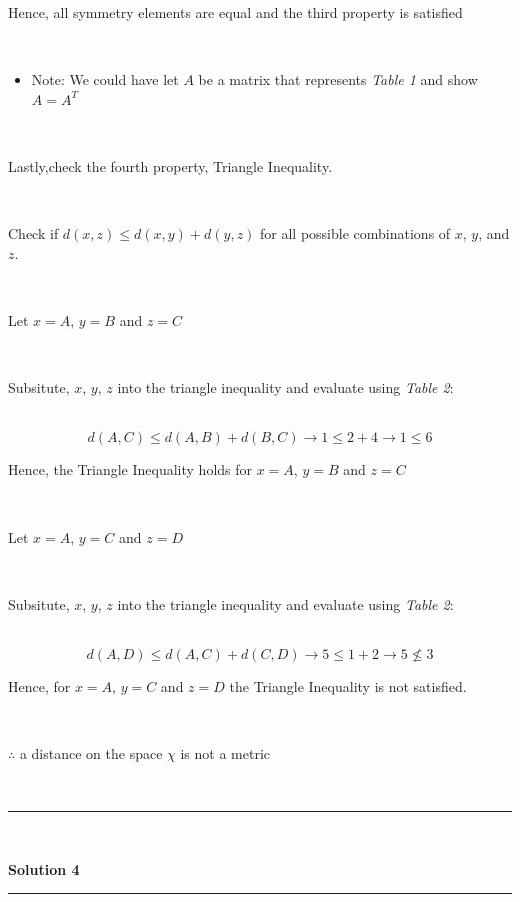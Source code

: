 \documentclass{article}
\begin{document}
\parbox{\textwidth}{Hence, all symmetry elements are equal and the third property is satisfied}\\

\begin{itemize}
  \item \parbox{\textwidth}{Note: We could have let $A$ be a matrix that represents \textit{Table 1} and show $A=A^T$}\\
\end{itemize}

\parbox{\textwidth}{Lastly,check the fourth property, Triangle Inequality.}\\

\parbox{\textwidth}{Check if $d(x,z) \leq d(x,y) + d(y,z)$ for all possible combinations of $x$, $y$, and $z$.}\\

\parbox{\textwidth}{Let $x=A$, $y=B$ and $z=C$}\\

\parbox{\textwidth}{Subsitute, $x$, $y$, $z$ into the triangle inequality and evaluate using \textit{Table 2}:}\\

$$d(A,C) \leq d(A,B) + d(B,C) \rightarrow 1 \leq 2 + 4 \rightarrow 1 \leq 6$$

\parbox{\textwidth}{Hence, the Triangle Inequality holds for $x=A$, $y=B$ and $z=C$}\\

\parbox{\textwidth}{Let $x=A$, $y=C$ and $z=D$}\\

\parbox{\textwidth}{Subsitute, $x$, $y$, $z$ into the triangle inequality and evaluate using \textit{Table 2}:}\\

$$d(A,D) \leq d(A,C) + d(C,D) \rightarrow 5 \leq 1 + 2 \rightarrow 5 \nleq 3$$

\parbox{\textwidth}{Hence, for $x=A$, $y=C$ and $z=D$ the Triangle Inequality is not satisfied.}\\

\parbox{\textwidth}{$\therefore$ a distance on the space $\chi$ is not a metric}\\

\noindent\rule{\textwidth}{0.4pt}\\

\newpage

\textbf{Solution 4}

\noindent\rule{\textwidth}{0.4pt}\\
\end{document}
